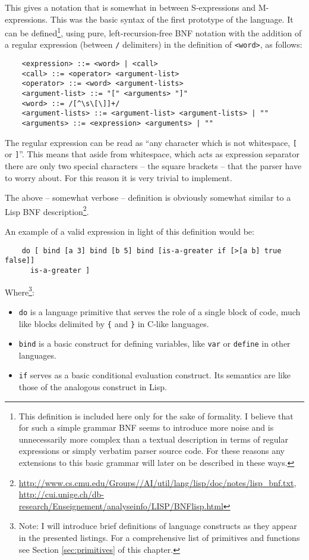 This gives a notation that is somewhat in between S-expressions and
M-expressions. This was the basic syntax of the first prototype of the
language. It can be defined\footnote{This definition is included here only for
  the sake of formality. I believe that for such a simple grammar BNF seems to
  introduce more noise and is unnecessarily more complex than a textual
  description in terms of regular expressions or simply verbatim parser source
  code. For these reasons any extensions to this basic grammar will later on be
  described in these ways.}, using pure, left-recursion-free BNF notation with
the addition of a regular expression (between \texttt{/} delimiters) in the
definition of \texttt{<word>}, as follows:
\begin{lstlisting}
    <expression> ::= <word> | <call>
    <call> ::= <operator> <argument-list>
    <operator> ::= <word> <argument-lists>
    <argument-list> ::= "[" <arguments> "]"
    <word> ::= /[^\s\[\]]+/
    <argument-lists> ::= <argument-list> <argument-lists> | ""
    <arguments> ::= <expression> <arguments> | ""
\end{lstlisting}

The regular expression can be read as ``any character which is not whitespace,
\texttt{[} or \texttt{]}''. This means that aside from whitespace, which acts as
expression separator there are only two special characters -- the square
brackets -- that the parser have to worry about. For this reason it is very
trivial to implement.

The above -- somewhat verbose -- definition is obviously somewhat similar to a
Lisp BNF
description\footnote{\url{http://www.cs.cmu.edu/Groups//AI/util/lang/lisp/doc/notes/lisp_bnf.txt},
  \url{http://cui.unige.ch/db-research/Enseignement/analyseinfo/LISP/BNFlisp.html}}.

An example of a valid expression in light of this definition would be:
\begin{lstlisting}
    do [ bind [a 3] bind [b 5] bind [is-a-greater if [>[a b] true false]]
      is-a-greater ]
\end{lstlisting}

Where\footnote{Note: I will introduce brief definitions of language constructs
  as they appear in the presented listings. For a comprehensive list of
  primitives and functions see Section \ref{sec:primitives} of this chapter.}:
\begin{itemize}
    \item \texttt{do} is a language primitive that serves the role of a single
      block of code, much like blocks delimited by \texttt{\{} and \texttt{\}}
      in C-like languages.
    \item \texttt{bind} is a basic construct for defining variables, like
      \texttt{var} or \texttt{define} in other languages.
    \item \texttt{if} serves as a basic conditional evaluation construct. Its
      semantics are like those of the analogous construct in Lisp.
\end{itemize}

